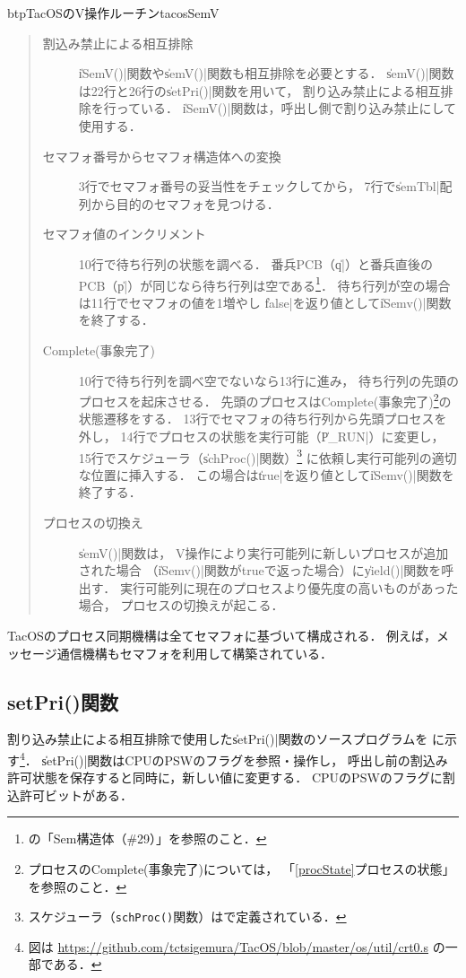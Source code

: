 \begin{myfig}{btp}{TacOSのV操作ルーチン}{tacosSemV}

\end{myfig}

\begin{quote}
\begin{description}
\item [割込み禁止による相互排除]
\|iSemV()|関数や\|semV()|関数も相互排除を必要とする．
\|semV()|関数は22行と26行の\|setPri()|関数を用いて，
割り込み禁止による相互排除を行っている．
\|iSemV()|関数は，呼出し側で割り込み禁止にして使用する．

\item [セマフォ番号からセマフォ構造体への変換]
3行でセマフォ番号の妥当性をチェックしてから，
7行で\|semTbl|配列から目的のセマフォを見つける．

\item [セマフォ値のインクリメント]
10行で待ち行列の状態を調べる．
番兵PCB（\|q|）と番兵直後のPCB（\|p|）が同じなら待ち行列は空である\footnote{
の「Sem構造体（\#29）」を参照のこと．}．
待ち行列が空の場合は11行でセマフォの値を1増やし
\|false|を返り値として\|iSemv()|関数を終了する．

\item [Complete(事象完了)]
10行で待ち行列を調べ空でないなら13行に進み，
待ち行列の先頭のプロセスを起床させる．
先頭のプロセスはComplete(事象完了)\footnote{
プロセスのComplete(事象完了)については，
「\ref{procState}プロセスの状態」を参照のこと．}の状態遷移をする．
13行でセマフォの待ち行列から先頭プロセスを外し，
14行でプロセスの状態を実行可能（\|P_RUN|）に変更し，
15行でスケジューラ（\|schProc()|関数）\footnote{
スケジューラ（{\tt schProc()}関数）はで定義されている．}
に依頼し実行可能列の適切な位置に挿入する．
この場合は\|true|を返り値として\|iSemv()|関数を終了する．

\item [プロセスの切換え]
\|semV()|関数は，
V操作により実行可能列に新しいプロセスが追加された場合
（\|iSemv()|関数がtrueで返った場合）に\|yield()|関数を呼出す．
実行可能列に現在のプロセスより優先度の高いものがあった場合，
プロセスの切換えが起こる．
\end{description}
\end{quote}

TacOSのプロセス同期機構は全てセマフォに基づいて構成される．
例えば，メッセージ通信機構もセマフォを利用して構築されている．

\subsection{setPri()関数}
\label{setPri}
割り込み禁止による相互排除で使用した\|setPri()|関数のソースプログラムを
に示す\footnote{図は
\url{https://github.com/tctsigemura/TacOS/blob/master/os/util/crt0.s}
の一部である．}．
\|setPri()|関数はCPUのPSWのフラグを参照・操作し，
呼出し前の割込み許可状態を保存すると同時に，新しい値に変更する．
CPUのPSWのフラグに割込許可ビットがある．


